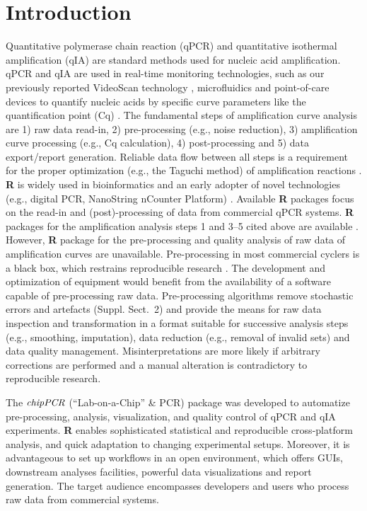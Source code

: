 \documentclass{bioinfo}
\begin{document}
\section{Introduction}

Quantitative polymerase chain reaction (qPCR) and quantitative isothermal 
amplification (qIA) are standard methods used for nucleic acid amplification. 
qPCR and qIA are used in real-time monitoring technologies, such as our 
previously reported VideoScan technology 
\citep{roediger_highly_2013,spiess_impact_2014}, microfluidics and point-of-care 
devices to quantify nucleic acids by specific curve parameters like the 
quantification point (Cq) \citep{pabinger_2014,rodiger_nucleic_2014}. The 
fundamental steps of amplification curve analysis are 1) raw data read-in, 2) 
pre-processing (e.g., noise reduction), 3) amplification curve processing (e.g., 
Cq calculation), 4) post-processing and 5) data export/report generation. 
Reliable data flow between all steps is a requirement for the proper 
optimization (e.g., the Taguchi method) of amplification reactions 
\citep{cobb_1994}. \textbf{R} is widely used in bioinformatics and an early 
adopter of novel technologies (e.g., digital PCR, NanoString nCounter Platform) 
\citep{waggott_2012,pabinger_2014}. Available \textbf{R} packages focus on the 
read-in and (post)-processing of data from commercial qPCR systems. \textbf{R} 
packages for the amplification analysis steps 1 and 3--5 cited above are 
available \citep{perkins_2012,gehlenborg_2013,mccall_2014,pabinger_2014}. 
However, \textbf{R} package for the pre-processing and quality 
analysis of raw data of amplification curves are unavailable. Pre-processing in most commercial 
cyclers is a black box, which restrains reproducible research 
\citep{Leeper_2014}. The development and optimization of equipment would benefit 
from the availability of a software capable of pre-processing raw data. 
Pre-processing algorithms remove stochastic errors and artefacts (Suppl. 
Sect.~2) and provide the means for raw data inspection and transformation in a 
format suitable for successive analysis steps (e.g., smoothing, imputation), 
data reduction (e.g., removal of invalid sets) and data quality management. 
Misinterpretations are more likely if arbitrary corrections are performed and a 
manual alteration is contradictory to reproducible research.

The $\emph{chipPCR}$ (``Lab-on-a-Chip'' \& PCR) package was 
developed to automatize pre-processing, analysis, visualization, and quality 
control of qPCR and qIA experiments. \textbf{R} enables sophisticated 
statistical and reproducible cross-platform analysis, and quick adaptation to 
changing experimental setups. Moreover, it is advantageous to set up workflows 
in an open environment, which offers GUIs, downstream analyses facilities, 
powerful data visualizations and report generation. The target audience 
encompasses developers and users who process raw data from commercial systems.
\end{document}
